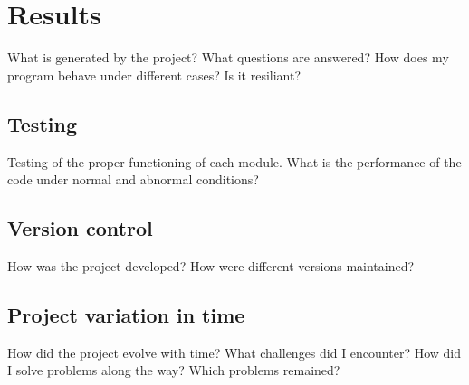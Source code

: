 \chapter{Results}
\label{ch:results}
What is generated by the project?
What questions are answered?
How does my program behave under different cases?
Is it resiliant?


\section{Testing}
Testing of the proper functioning of each module.
What is the performance of the code under normal and abnormal conditions?


\section{Version control}
How was the project developed?
How were different versions maintained?


\section{Project variation in time}
How did the project evolve with time?
What challenges did I encounter?
How did I solve problems along the way?
Which problems remained?